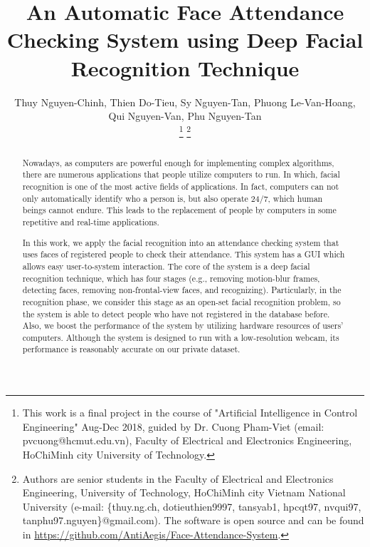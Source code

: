 \documentclass[journal, twocolumn]{IEEEtran}
\begin{document}
\title{An Automatic Face Attendance Checking System using Deep Facial Recognition Technique}


\author{Thuy Nguyen-Chinh,
		Thien Do-Tieu,
		Sy Nguyen-Tan,
		Phuong Le-Van-Hoang,
		Qui Nguyen-Van,
		Phu Nguyen-Tan

\thanks{This work is a final project in the course of "Artificial Intelligence in Control Engineering" Aug-Dec 2018, guided by Dr. Cuong Pham-Viet (email: pvcuong@hcmut.edu.vn), Faculty of Electrical and Electronics Engineering, HoChiMinh city University of Technology.}
\thanks{Authors are senior students in the Faculty of Electrical and Electronics Engineering, University of Technology, HoChiMinh city Vietnam National University (e-mail: \{thuy.ng.ch, dotieuthien9997, tansyab1, hpcqt97, nvqui97, tanphu97.nguyen\}@gmail.com). The software is open source and can be found in \url{https://github.com/AntiAegis/Face-Attendance-System}.}
}


\maketitle


\begin{abstract}
Nowadays, as computers are powerful enough for implementing complex algorithms, there are numerous applications that people utilize computers to run. In which, facial recognition is one of the most active fields of applications. In fact, computers can not only automatically identify who a person is, but also operate 24/7, which human beings cannot endure. This leads to the replacement of people by computers in some repetitive and real-time applications.

In this work, we apply the facial recognition into an attendance checking system that uses faces of registered people to check their attendance. This system has a GUI which allows easy user-to-system interaction. The core of the system is a deep facial recognition technique, which has four stages (e.g., removing motion-blur frames, detecting faces, removing non-frontal-view faces, and recognizing). Particularly, in the recognition phase, we consider this stage as an open-set facial recognition problem, so the system is able to detect people who have not registered in the database before. Also, we boost the performance of the system by utilizing hardware resources of users' computers. Although the system is designed to run with a low-resolution webcam, its performance is reasonably accurate on our private dataset.
\end{abstract}
\end{document}
